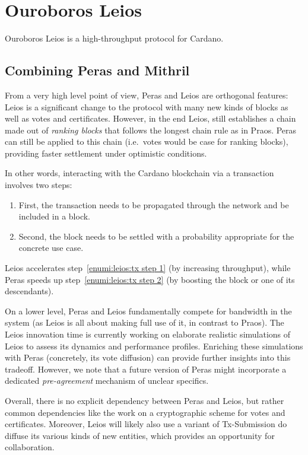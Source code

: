 \section{Ouroboros Leios}

Ouroboros Leios is a high-throughput protocol for Cardano.

\subsection{Combining Peras and Mithril}

From a very high level point of view, Peras and Leios are orthogonal features:
Leios is a significant change to the protocol with many new kinds of blocks as well as votes and certificates.
However, in the end Leios, still establishes a chain made out of \emph{ranking blocks} that follows the longest chain rule as in Praos.
Peras can still be applied to this chain (i.e.\ votes would be case for ranking blocks), providing faster settlement under optimistic conditions.

In other words, interacting with the Cardano blockchain via a transaction involves two steps:
\begin{enumerate}
\item\label{enumi:leios:tx step 1}
  First, the transaction needs to be propagated through the network and be included in a block.
\item\label{enumi:leios:tx step 2}
  Second, the block needs to be settled with a probability appropriate for the concrete use case.
\end{enumerate}
Leios accelerates step~\ref{enumi:leios:tx step 1} (by increasing throughput), while Peras speeds up step~\ref{enumi:leios:tx step 2} (by boosting the block or one of its descendants).

On a lower level, Peras and Leios fundamentally compete for bandwidth in the system (as Leios is all about making full use of it, in contrast to Praos).
The Leios innovation time is currently working on elaborate realistic simulations of Leios to assess its dynamics and performance profiles.
Enriching these simulations with Peras (concretely, its vote diffusion) can provide further insights into this tradeoff.
However, we note that a future version of Peras might incorporate a dedicated \emph{pre-agreement} mechanism of unclear specifics.

Overall, there is no explicit dependency between Peras and Leios, but rather common dependencies like the work on a cryptographic scheme for votes and certificates.
Moreover, Leios will likely also use a variant of Tx-Submission do diffuse its various kinds of new entities, which provides an opportunity for collaboration.

